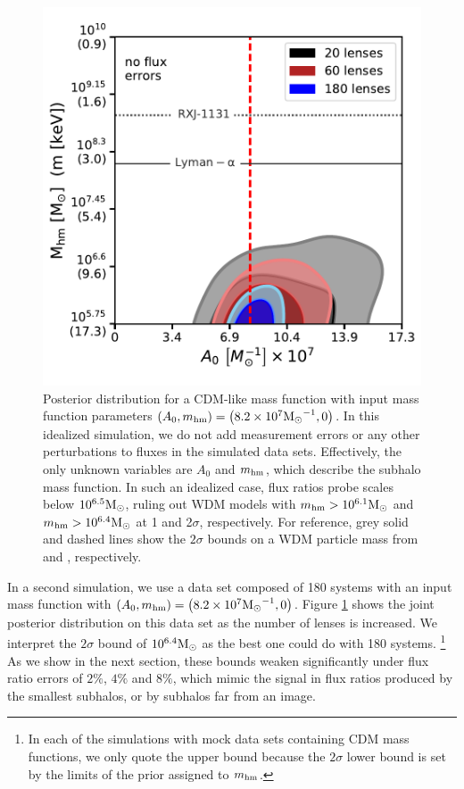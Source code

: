 \begin{figure}
	\centering
	\includegraphics[clip,trim=0cm .5cm .3cm
	.5cm,width=.75\textwidth,keepaspectratio]{./figures_ABCforward/joint_varynlens_noerrors.pdf}
	\caption[Posterior distribution inferred from CDM mock datasets with no measurement errors]{\label{fig:cdm_inf_noerror} Posterior distribution for a CDM-like mass function with input mass function parameters $\left(A_0,m_{\rm{hm}}\right) = \left(8.2 \times 10^7 {\rm{M}_{\odot}}^{-1},0\right)$. In this idealized simulation, we do not add measurement errors or any other perturbations to fluxes in the simulated data sets. Effectively, the only unknown variables are $A_0$ and $m_{\rm{hm}}$, which describe the subhalo mass function. In such an idealized case, flux ratios probe scales below $10^{6.5} {\rm{M}_{\odot}}$, ruling out WDM models with $m_{\rm{hm}} > 10^{6.1} {\rm{M}_{\odot}}$ and $m_{\rm{hm}} > 10^{6.4}{\rm{M}_{\odot}}$ at 1 and 2$\sigma$, respectively. For reference, grey solid and dashed lines show the $2\sigma$ bounds on a WDM particle mass from \citet{Viel13} and \citet{Birrer++17a}, respectively.}
\end{figure}

In a second simulation, we use a data set composed of 180 systems with an input mass function with $\left(A_0,m_{\rm{hm}}\right) = \left(8.2\times 10^7 {\rm{M}_{\odot}}^{-1},0 \right)$. Figure \ref{fig:cdm_inf_noerror} shows the joint posterior distribution on this data set as the number of lenses is increased. We interpret the $2 \sigma$ bound of $10^{6.4} {\rm{M}_{\odot}}$ as the best one could do with 180 systems. \footnote{In each of the simulations with mock data sets containing CDM mass functions, we only quote the upper bound because the $2 \sigma$ lower bound is set by the limits of the prior assigned to $m_{\rm{hm}}$.} As we show in the next section, these bounds weaken significantly under flux ratio errors of $2\%$, $4\%$ and $8\%$, which mimic the signal in flux ratios produced by the smallest subhalos, or by subhalos far from an image.

